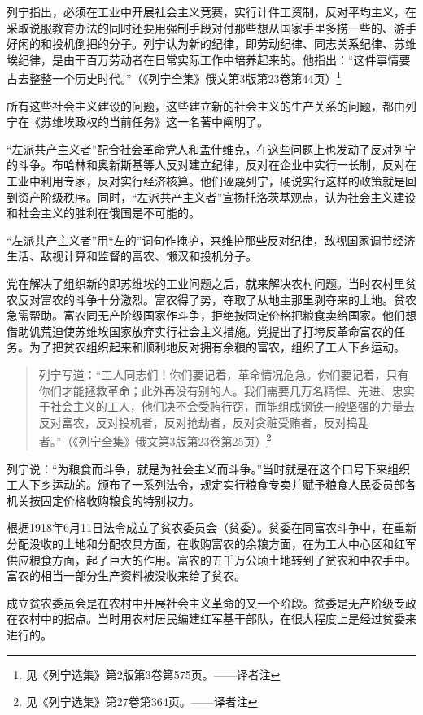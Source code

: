 列宁指出，必须在工业中开展社会主义竞赛，实行计件工资制，反对平均主义，在采取说服教育办法的同时还要用强制手段对付那些想从国家手里多捞一些的、游手好闲的和投机倒把的分子。列宁认为新的纪律，即劳动纪律、同志关系纪律、苏维埃纪律，是由干百万劳动者在日常实际工作中培养起来的。他指出：“这件事情要占去整整一个历史时代。”（《列宁全集》俄文第3版第23卷第44页）\footnote{见《列宁选集》第2版第3卷第575页。——译者注}

所有这些社会主义建设的问题，这些建立新的社会主义的生产关系的问题，都由列宁在《苏维埃政权的当前任务》这一名著中阐明了。

“左派共产主义者”配合社会革命党人和孟什维克，在这些问题上也发动了反对列宁的斗争。布哈林和奥新斯基等人反对建立纪律，反对在企业中实行一长制，反对在工业中利用专家，反对实行经济核算。他们诬蔑列宁，硬说实行这样的政策就是回到资产阶级秩序。同时，“左派共产主义者”宣扬托洛茨基观点，认为社会主义建设和社会主义的胜利在俄国是不可能的。

“左派共产主义者”用“左的”词句作掩护，来维护那些反对纪律，敌视国家调节经济生活、敌视计算和监督的富农、懒汉和投机分子。

党在解决了组织新的即苏维埃的工业问题之后，就来解决农村问题。当时农村里贫农反对富农的斗争十分激烈。富农得了势，夺取了从地主那里剥夺来的土地。贫农急需帮助。富农同无产阶级国家作斗争，拒绝按固定价格把粮食卖给国家。他们想借助饥荒迫使苏维埃国家放弃实行社会主义措施。党提出了打垮反革命富农的任务。为了把贫农组织起来和顺利地反对拥有余粮的富农，组织了工人下乡运动。

\begin{quotation}
列宁写道：“工人同志们！你们要记着，革命情况危急。你们要记着，只有你们才能拯救革命；此外再没有别的人。我们需要几万名精悍、先进、忠实于社会主义的工人，他们决不会受贿行窃，而能组成钢铁一般坚强的力量去反对富农，反对投机者，反对抢劫者，反对贪赃受贿者，反对捣乱者。”（《列宁全集》俄文第3版第23卷第25页）\footnote{见《列宁选集》第27卷第364页。——译者注}
\end{quotation}

列宁说：“为粮食而斗争，就是为社会主义而斗争。”当时就是在这个口号下来组织工人下乡运动的。颁布了一系列法令，规定实行粮食专卖并赋予粮食人民委员部各机关按固定价格收购粮食的特别权力。

根据1918年6月11日法令成立了贫农委员会（贫委）。贫委在同富农斗争中，在重新分配没收的土地和分配农具方面，在收购富农的余粮方面，在为工人中心区和红军供应粮食方面，起了巨大的作用。富农的五千万公顷土地转到了贫农和中农手中。富农的相当一部分生产资料被没收来给了贫农。

成立贫农委员会是在农村中开展社会主义革命的又一个阶段。贫委是无产阶级专政在农村中的据点。当时用农村居民编建红军基干部队，在很大程度上是经过贫委来进行的。


